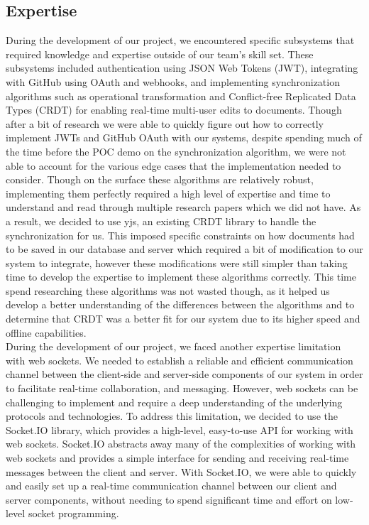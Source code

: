\documentclass{article}
\begin{document}
	\subsection{Expertise}
	
	During the development of our project, we encountered specific subsystems that required knowledge and expertise outside of our team's skill set. These subsystems included authentication using JSON Web Tokens (JWT), integrating with GitHub using OAuth and webhooks, and implementing synchronization algorithms such as operational transformation and Conflict-free Replicated Data Types (CRDT) for enabling real-time multi-user edits to documents. Though after a bit of research we were able to quickly figure out how to correctly implement JWTs and GitHub OAuth with our systems, despite spending much of the time before the POC demo on the synchronization algorithm, we were not able to account for the various edge cases that the implementation needed to consider. Though on the surface these algorithms are relatively robust, implementing them perfectly required a high level of expertise and time to understand and read through multiple research papers which we did not have. As a result, we decided to use yjs, an existing CRDT library to handle the synchronization for us. This imposed specific constraints on how documents had to be saved in our database and server which required a bit of modification to our system to integrate, however these modifications were still simpler than taking time to develop the expertise to implement these algorithms correctly. This time spend researching these algorithms was not wasted though, as it helped us develop a better understanding of the differences between the algorithms and to determine that CRDT was a better fit for our system due to its higher speed and offline capabilities.\\
	
	\noindent During the development of our project, we faced another expertise limitation with web sockets. We needed to establish a reliable and efficient communication channel between the client-side and server-side components of our system in order to facilitate real-time collaboration, and messaging. However, web sockets can be challenging to implement and require a deep understanding of the underlying protocols and technologies. To address this limitation, we decided to use the Socket.IO library, which provides a high-level, easy-to-use API for working with web sockets. Socket.IO abstracts away many of the complexities of working with web sockets and provides a simple interface for sending and receiving real-time messages between the client and server. With Socket.IO, we were able to quickly and easily set up a real-time communication channel between our client and server components, without needing to spend significant time and effort on low-level socket programming.
	
\end{document}
